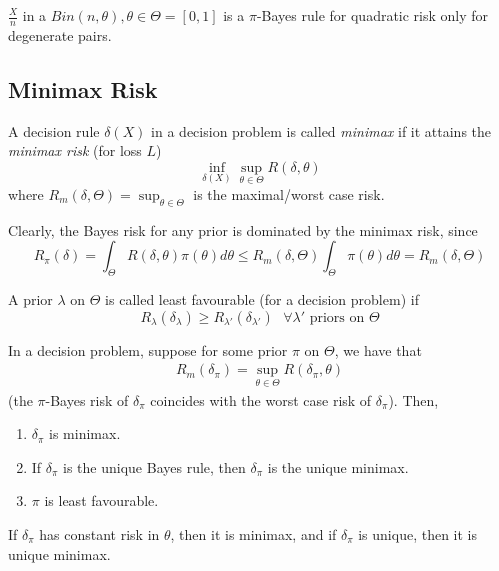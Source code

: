 \documentclass[a4paper]{article}
\begin{document}
\begin{eg}
	$\frac{X}{n}$ in a $Bin(n,\theta), \theta \in \Theta =[0,1]$ is a $\pi$-Bayes rule for quadratic risk only for degenerate pairs.
\end{eg}

\subsection{Minimax Risk}

\begin{defn}
	A decision rule $\delta(X)$ in a decision problem is called \textit{minimax} if it attains the \textit{minimax risk} (for loss $L$)
	\[
		\inf_{\delta(X)} \sup_{\theta \in \Theta} R(\delta, \theta)
	\]
	where $R_{m}(\delta, \Theta) = \sup_{\theta \in \Theta}$ is the maximal/worst case risk.
\end{defn}

Clearly, the Bayes risk for any prior is dominated by the minimax risk, since
\[
	R_{\pi}(\delta) = \int_{\Theta} R(\delta,\theta) \pi(\theta) d\theta \le R_{m}(\delta, \Theta) \int_{\Theta} \pi(\theta) d\theta = R_{m}(\delta, \Theta)
\] 

A prior $\lambda$ on $\Theta$ is called least favourable (for a decision problem) if
\[
	R_{\lambda}(\delta_{\lambda}) \ge R_{\lambda'}(\delta_{\lambda'}) \text{ } \forall \lambda' \text{ priors on } \Theta
\] 

\begin{prop}
	In a decision problem, suppose for some prior $\pi$ on $\Theta$, we have that 
	\begin{align*}
		R_{m}(\delta_{\pi}) = \sup_{\theta \in  \Theta} R(\delta_{\pi}, \theta)
	\end{align*}
	(the $\pi$-Bayes risk of $\delta_{\pi}$ coincides with the worst case risk of $\delta_{\pi}$).
	Then,

	\begin{enumerate}[label=\roman*)]
		\item $\delta_{\pi}$ is minimax.

		\item If $\delta_{\pi}$ is the unique Bayes rule, then $\delta_{\pi}$ is the unique minimax.

		\item $\pi$ is least favourable.
		
	\end{enumerate}
\end{prop}

\begin{corol}
	If $\delta_{\pi}$ has constant risk in $\theta$, then it is minimax, and if $\delta_{\pi}$ is unique, then it is unique minimax.
\end{corol}
\end{document}
